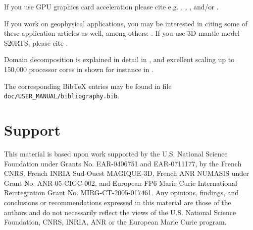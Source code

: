 If you use GPU graphics card acceleration please cite e.g. \cite{Kom11}, \cite{MiKo10}, \cite{KoMiEr09}, and/or \cite{KoErGoMi10}.\newline


If you work on geophysical applications, you may be interested in citing some of these application articles as well, among others:
\cite{WiKoScTr04,JiTsKoTr05,KrJiKoTr06a,KrJiKoTr06b,LeChLiKoHuTr08,LeChKoHuTr09,LeKoHuTr09,ChFaKo04,FaChKo04,RiRiKoTrHe02,GoAmTaCaSmSaMaKo09,TrKo00,SaKoTr10}.
If you use 3D mantle model S20RTS, please cite \citet{RiVaWo99}.\newline


Domain decomposition is explained in detail in \cite{MaKoBlLe08}, and excellent scaling up to 150,000 processor cores in shown for instance in
\cite{CaKoLaTiMiLeSnTr08,KoLaMi08a,MaKoBlLe08,KoErGoMi10,Kom11}.\newline


The corresponding Bib\TeX{} entries may be found
in file \texttt{doc/USER\_MANUAL/bibliography.bib}.

\section{Support}

This material is based upon work supported by the U.S. National Science
Foundation under Grants No. EAR-0406751 and EAR-0711177, by the French
CNRS, French INRIA Sud-Ouest MAGIQUE-3D, French ANR NUMASIS under
Grant No. ANR-05-CIGC-002, and European FP6 Marie Curie International
Reintegration Grant No. MIRG-CT-2005-017461.
Any opinions, findings, and conclusions or recommendations expressed in this material are
those of the authors and do not necessarily reflect the views of the
U.S. National Science Foundation, CNRS, INRIA, ANR or the European
Marie Curie program.



